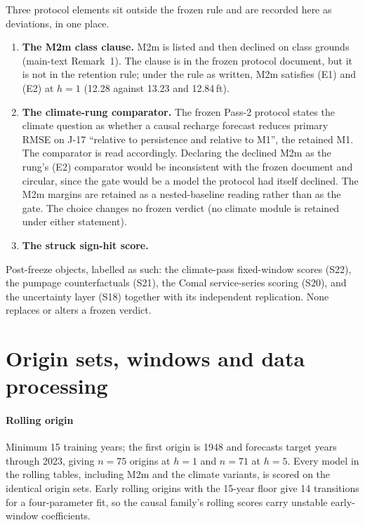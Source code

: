 \documentclass[preprint,11pt,authoryear]{elsarticle}
\theoremstyle{remark}
\begin{document}
Three protocol elements sit outside the frozen rule and are recorded here as deviations, in one place.
\begin{enumerate}[leftmargin=2em]
\item \textbf{The M2m class clause.} M2m is listed and then declined on class grounds (main-text Remark~1). The clause is in the frozen protocol document, but it is not in the retention rule; under the rule as written, M2m satisfies (E1) and (E2) at $h=1$ (12.28 against 13.23 and 12.84\,ft).
\item \textbf{The climate-rung comparator.} The frozen Pass-2 protocol states the climate question as whether a causal recharge forecast reduces primary RMSE on J-17 ``relative to persistence and relative to M1'', the retained M1. The comparator is read accordingly. Declaring the declined M2m as the rung's (E2) comparator would be inconsistent with the frozen document and circular, since the gate would be a model the protocol had itself declined. The M2m margins are retained as a nested-baseline reading rather than as the gate. The choice changes no frozen verdict (no climate module is retained under either statement).
\item \textbf{The struck sign-hit score.}
\end{enumerate}

Post-freeze objects, labelled as such: the climate-pass fixed-window scores (S22), the pumpage counterfactuals (S21), the Comal service-series scoring (S20), and the uncertainty layer (S18) together with its independent replication. None replaces or alters a frozen verdict.

\section{Origin sets, windows and data processing}\label{si:edworigins}

\paragraph{Rolling origin} Minimum 15 training years; the first origin is 1948 and forecasts target years through 2023, giving $n=75$ origins at $h=1$ and $n=71$ at $h=5$. Every model in the rolling tables, including M2m and the climate variants, is scored on the identical origin sets. Early rolling origins with the 15-year floor give 14 transitions for a four-parameter fit, so the causal family's rolling scores carry unstable early-window coefficients.
\end{document}
